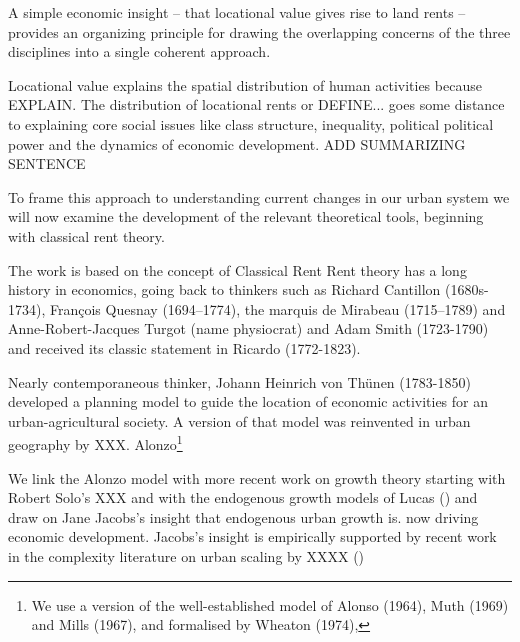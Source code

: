 A simple economic insight -- that locational value gives rise to land rents -- provides an organizing principle for %
drawing the overlapping concerns of the three disciplines into a single coherent approach.

Locational value explains the spatial distribution of human activities because EXPLAIN. The distribution of locational rents or DEFINE... goes some distance to explaining core social issues like class structure, inequality, political political power and the dynamics of economic development.  ADD SUMMARIZING SENTENCE

To frame this approach to understanding current changes in our urban system we will now examine the development of the relevant theoretical tools, beginning with classical rent theory. %

The work is based on the concept of Classical Rent
Rent theory has a long history in economics, going back to thinkers such as Richard Cantillon (1680s-1734), François Quesnay (1694–1774), the marquis de Mirabeau (1715–1789) and Anne-Robert-Jacques Turgot (name physiocrat) and Adam Smith (1723-1790) and received its classic statement in Ricardo (1772-1823). %

Nearly contemporaneous thinker, Johann Heinrich  von Th\"unen (1783-1850) developed a planning model to guide the location of economic activities for an urban-agricultural society.  A version of that model  was reinvented in urban geography by XXX. Alonzo\footnote{We use a version of the well-established model of Alonso (1964), Muth (1969) and Mills (1967), and formalised by Wheaton (1974),} %

We link the Alonzo model with more recent work on growth theory starting with Robert Solo's XXX and with the endogenous growth models of Lucas () and draw on Jane Jacobs's insight that endogenous urban growth  is. now driving economic development. Jacobs's insight is empirically supported by recent work in the complexity literature on urban scaling by XXXX ()



